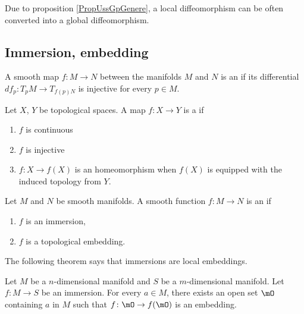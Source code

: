 Due to proposition \ref{PropUssGpGenere}, a local diffeomorphism can be often converted into a global diffeomorphism.


\subsection{Immersion, embedding}

\begin{definition}    \label{DEFooZEWNooMVOzWI}
	A smooth map \( f\colon M\to N\) between the manifolds \( M\) and \( N\) is an  if its differential \( df_p\colon T_pM\to T_{f(p)N}\) is injective for every \( p\in M\).
\end{definition}

\begin{definition}
	Let \( X\), \( Y\) be topological spaces. A map \( f\colon X\to Y\) is a  if
	\begin{enumerate}
		\item
		      \( f\) is continuous
		\item
		      \( f\) is injective
		\item
		      \( f\colon X\to f(X)\) is an homeomorphism when \( f(X)\) is equipped with the induced topology from \( Y\).
	\end{enumerate}
\end{definition}

\begin{definition}       \label{DEFooQLGLooNyXaOV}
	Let \( M\) and \( N\) be smooth manifolds. A smooth function \( f\colon M\to N\) is an  if
	\begin{enumerate}
		\item
		      \( f\) is an immersion,
		\item
		      \( f\) is a topological embedding.
	\end{enumerate}
\end{definition}

The following theorem says that immersions are local embeddings.
\begin{theorem}       \label{THOooXAOUooRKHMBm}
	Let \( M\) be a \( n\)-dimensional manifold and \( S\) be a \( m\)-dimensional manifold. Let \( f\colon M\to S\) be an immersion. For every \( a\in M\), there exists an open set \( \mO\) containing \( a\) in \( M\) such that \( f\colon \mO\to f(\mO)\) is an embedding.
\end{theorem}

